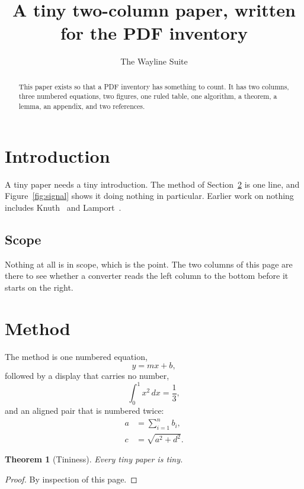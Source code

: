 \documentclass[twocolumn]{article}
\title{A tiny two-column paper, written for the PDF inventory}
\author{The Wayline Suite}
\date{}
\newtheorem{theorem}{Theorem}
\begin{document}
\maketitle

\begin{abstract}
This paper exists so that a PDF inventory has something to count. It has two columns,
three numbered equations, two figures, one ruled table, one algorithm, a theorem, a lemma,
an appendix, and two references.
\end{abstract}

\section{Introduction}
A tiny paper needs a tiny introduction. The method of Section~\ref{sec:method} is one
line, and Figure~\ref{fig:signal} shows it doing nothing in particular. Earlier work on
nothing includes Knuth~\cite{knuth1984} and Lamport~\cite{lamport1994}.

\subsection{Scope}
Nothing at all is in scope, which is the point. The two columns of this page are there to
see whether a converter reads the left column to the bottom before it starts on the right.

\section{Method}
\label{sec:method}
The method is one numbered equation,
\begin{equation}
  y = m x + b ,
  \label{eq:line}
\end{equation}
followed by a display that carries no number,
\[
  \int_0^1 x^2 \, dx = \frac{1}{3} ,
\]
and an aligned pair that is numbered twice:
\begin{align}
  a &= \sum_{i=1}^{n} b_i , \label{eq:sum} \\
  c &= \sqrt{a^2 + d^2} . \label{eq:root}
\end{align}

\begin{theorem}[Tininess]
\label{thm:tiny}
Every tiny paper is tiny.
\end{theorem}

\begin{proof}
By inspection of this page.
\end{proof}
\end{document}
